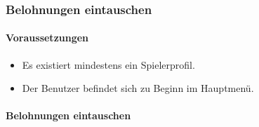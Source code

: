 \subsubsection{Belohnungen eintauschen}
\paragraph{Voraussetzungen}
\begin{itemize}
	\item Es existiert mindestens ein Spielerprofil.
	\item Der Benutzer befindet sich zu Beginn im Hauptmenü.
\end{itemize}
\paragraph{Belohnungen eintauschen}
